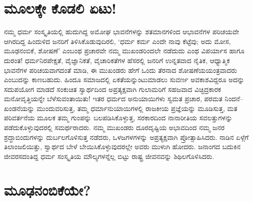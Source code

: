 \newpage


\section*{ಮೂಲಕ್ಕೇ ಕೊಡಲಿ ಏಟು!}


ನಮ್ಮ ಧರ್ಮ ಸಂಸ್ಕೃತಿಯಲ್ಲಿ ಹುದುಗಿದ್ದ ಅಮೋಘ ಭಾವನೆಗಳನ್ನು ಶತಮಾನಗಳಿಂದ ಆ\break ಭಾವನೆಗಳ ಪರಿಚಯವೇ ಆಗಿರದಿದ್ದ ಹಿಂದುಳಿದ ಜನರಿಗೆ ತಿಳಿಸಿಕೊಡುವುದಿರಲಿ, ‘ಧರ್ಮ ಕರ್ಮ ಎಂದೇ ನಾವು ಕೆಟ್ಟೆವು; ಅದು ಮೋಸ, ಮೂಢನಂಬಿಕೆ, ಶೋಷಣೆ’ ಎಂಬಂಥ ಪ್ರಚಾರವೇ ನಮ್ಮ ಮುಖಂಡರಿಂದಲೇ ನಡೆದುದು ಎಂಥ ವಿಪರ್ಯಾಸ ಹಾಗೂ ದುರಂತ! ಧರ್ಮನಿರಪೇಕ್ಷತೆ, ವೈಜ್ಞಾನಿಕತೆ, ವೈಚಾರಿಕತೆಗಳ ಹೆಸರಲ್ಲಿ ಜನರಿಗೆ ಉನ್ನತವಾದ ನೈತಿಕ, ಆಧ್ಯಾತ್ಮಿಕ ಭಾವನೆಗಳ ಪರಿಚಯವಾಗದಂತೆ ಮಾಡಿ, ಈ ಮುಖಂಡರು ಹೇಗೆ ಒಂದು ತೆರನಾದ ಶೋಷಣೆಯ\break ಯಂತ್ರವಾದರು ಎಂಬುದನ್ನು ಕಾಣಬಹುದು. ಹಿಂದೂ ಸಮಾಜದಲ್ಲಿ ಏಕತೆಯನ್ನುಂಟು\-ಮಾಡಲು ಸುವರ್ಣ ಅವಕಾಶವಿದ್ದರೂ ಅದನ್ನು ಸದುಪಯೋಗ ಮಾಡದೆ ಸಂಕುಚಿತ ಸ್ವಾರ್ಥದಿಂದ ಅಪ್ರತ್ಯಕ್ಷವಾಗಿ ಗುಲಾಮರಿಗೆ ಸಹಜವಾದ ವಿಚ್ಛಿದ್ರಕಾರಕ ಮನೋವೃತ್ತಿಯನ್ನೇ ಬೆಳೆಸು\-ವಂತಾ\-ಯಿತು! ಇತರ ಧರ್ಮದ ಅನುಯಾಯಿಗಳು ಸ್ವಮತ ಪ್ರಚಾರ, ಪರಮತ ನಿಂದನೆ– ಖಂಡನೆಯನ್ನು ಮುಂದುವರಿಸುತ್ತ, ತಮ್ಮ ಧರ್ಮಾನುಯಾಯಿಗಳಲ್ಲಿ ರಾಜಕೀಯ ಪ್ರಜ್ಞೆಯನ್ನು ಮೂಡಿಸುತ್ತ, ಮತ ಪರಿವರ್ತನೆಯ ಮೂಲಕ ತಮ್ಮ ಗುಂಪನ್ನು ಬಲಪಡಿಸಿಕೊಳ್ಳುತ್ತ, ಸರಕಾರದಿಂದ ನಾನಾರೀತಿಯ ಸವಲತ್ತುಗಳನ್ನು ಪಡೆದುಕೊಳ್ಳುವುದರಲ್ಲಿ ಸಮರ್ಥರಾದರು. ನಮ್ಮ ಮುಖಂಡರು ದೂರದೃಷ್ಟಿಯ ಅಭಾವದಿಂದ ನಮ್ಮ ಜನರ ಶ್ರದ್ಧಾಬಿಂದುಗಳನ್ನು ದುರ್ಬಲಗೊಳಿಸುತ್ತ ನಡೆದರು, ಒಳಜಗಳಗಳನ್ನು ಅಪ್ರತ್ಯಕ್ಷವಾಗಿ ಪ್ರೋತ್ಸಾಹಿಸಿದರು. ನಾಡಿನ ಏಳ್ಗೆಗೆ ತಿಲಾಂಜಲಿ\-ಯಿತ್ತು, ಸ್ವಾರ್ಥದ ಬೇಳೆ ಬೇಯಿಸಿಕೊಳ್ಳುವುದರಲ್ಲೇ ಅವರು ಮುಳುಗಿ ಹೋದರು. ಜನಾಂಗದ ಬದುಕಿನ ಜೀವರಸದಂತಿದ್ದ ಧರ್ಮ ಸಂಸ್ಕೃತಿಯ ಮೌಲ್ಯಗಳನ್ನೆಲ್ಲ ಬಿಟ್ಟು ರಾಷ್ಟ್ರ ಜೀವನವನ್ನು ಶಿಥಿಲಗೊಳಿಸಿದರು.


\section*{ಮೂಢನಂಬಿಕೆಯೇ?}


